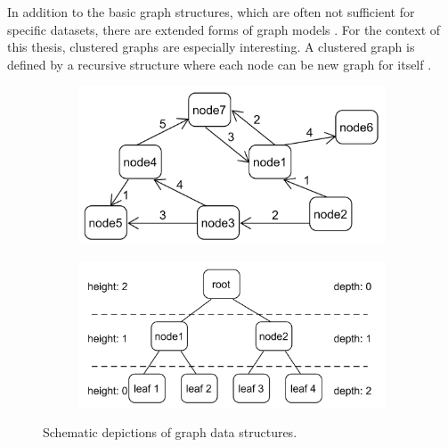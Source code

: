 In addition to the basic graph structures, which are often not sufficient for specific datasets, there are extended forms of graph models \cite{bertault_algorithm_1999}. 
For the context of this thesis, clustered graphs are especially interesting. A clustered graph is defined by a recursive structure where each node can be new graph for itself \cite{eades_multilevel_1997}. 

\begin{figure}[h]
    \centering
    \begin{subfigure}[b]{0.45\columnwidth}
        \centering
        \includegraphics[width=\textwidth]{graphics/weightedDirectedNetwork.png}
        \label{fig:simple_weighted_directed_network}
    \end{subfigure}\hfill
    \begin{subfigure}[b]{0.54\columnwidth}
        \centering
        \includegraphics[width=\textwidth]{graphics/basicTree.png}
        \label{fig:simple_tree}
    \end{subfigure}
    
    \caption{Schematic depictions of graph data structures.} %
    \label{fig:intro} 
  \end{figure}

